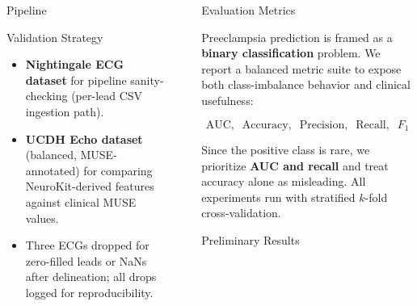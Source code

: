 \documentclass[final]{beamer}
\newlength{\sepwidth}
\newlength{\colwidth}
\newcommand{\separatorcolumn}{\begin{column}{\sepwidth}\end{column}}
\begin{document}
\begin{frame}[t]
\begin{columns}[t]
\begin{column}{\colwidth}
\begin{block}{Pipeline}
  \end{block}

  \begin{block}{Validation Strategy}

    \begin{itemize}
      \item \textbf{Nightingale ECG dataset} for pipeline sanity-checking
        (per-lead CSV ingestion path).
      \item \textbf{UCDH Echo dataset} (balanced, MUSE-annotated) for
        comparing NeuroKit-derived features against clinical MUSE values.
      \item Three ECGs dropped for zero-filled leads or NaNs after
        delineation; all drops logged for reproducibility.
    \end{itemize}

  \end{block}

\end{column}

\separatorcolumn

\begin{column}{\colwidth}

  \begin{block}{Evaluation Metrics}

    Preeclampsia prediction is framed as a \textbf{binary classification}
    problem. We report a balanced metric suite to expose both class-imbalance
    behavior and clinical usefulness:

    $$
      \text{AUC}, \;\; \text{Accuracy}, \;\; \text{Precision}, \;\;
      \text{Recall}, \;\; F_1
    $$

    Since the positive class is rare, we prioritize \textbf{AUC and recall}
    and treat accuracy alone as misleading. All experiments run with
    stratified $k$-fold cross-validation.

  \end{block}

  \begin{block}{Preliminary Results}


\end{block}
\end{column}
\end{columns}
\end{frame}
\end{document}
